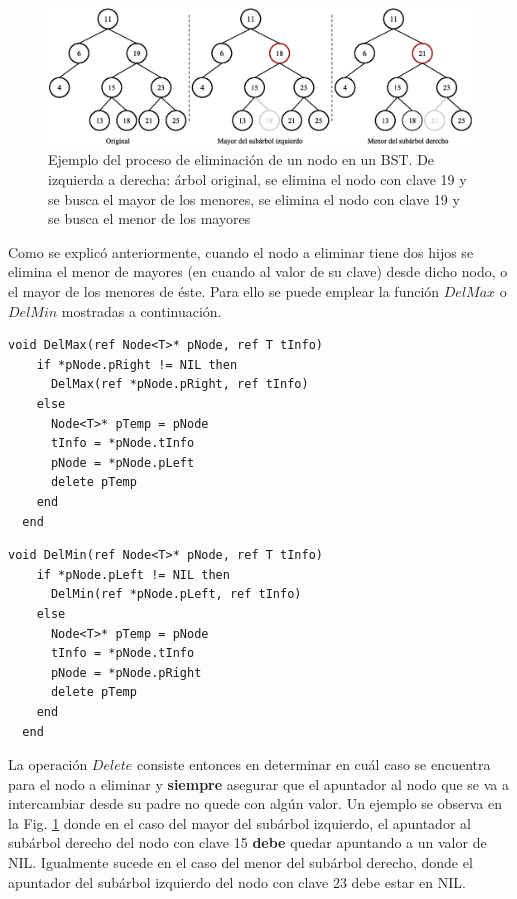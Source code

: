 \begin{figure}[htpb!]
  \begin{center}
    \includegraphics[width=1.0\columnwidth]{images/BSTDelete1.eps}
  \end{center}
  \caption{Ejemplo del proceso de eliminación de un nodo en un BST. De izquierda a derecha: árbol original, se elimina el nodo con clave 19 y se busca el mayor de los menores, se elimina el nodo con clave 19 y se busca el menor de los mayores}
  \label{fig:delsbt1}
\end{figure}

Como se explicó anteriormente, cuando el nodo a eliminar tiene dos hijos se elimina el menor de mayores (en cuando al valor de su clave) desde dicho nodo, o el mayor de los menores de éste. Para ello se puede emplear la función $DelMax$ o $DelMin$ mostradas a continuación.

\begin{lstlisting}[upquote=true, language=pseudo]  
  void DelMax(ref Node<T>* pNode, ref T tInfo)
    if *pNode.pRight != NIL then
      DelMax(ref *pNode.pRight, ref tInfo)
    else
      Node<T>* pTemp = pNode
      tInfo = *pNode.tInfo
      pNode = *pNode.pLeft
      delete pTemp
    end
  end
\end{lstlisting}

\begin{lstlisting}[upquote=true, language=pseudo]  
  void DelMin(ref Node<T>* pNode, ref T tInfo)
    if *pNode.pLeft != NIL then
      DelMin(ref *pNode.pLeft, ref tInfo)
    else
      Node<T>* pTemp = pNode
      tInfo = *pNode.tInfo
      pNode = *pNode.pRight
      delete pTemp
    end
  end
\end{lstlisting}  

La operación $Delete$ consiste entonces en determinar en cuál caso se encuentra para el nodo a eliminar y \textbf{siempre} asegurar que el apuntador al nodo que se va a intercambiar desde su padre no quede con algún valor. Un ejemplo se observa en la Fig. \ref{fig:delsbt1} donde en el caso del mayor del subárbol izquierdo, el apuntador al subárbol derecho del nodo con clave 15 \textbf{debe} quedar apuntando a un valor de NIL. Igualmente sucede en el caso del menor del subárbol derecho, donde el apuntador del subárbol izquierdo del nodo con clave 23 debe estar en NIL. 

